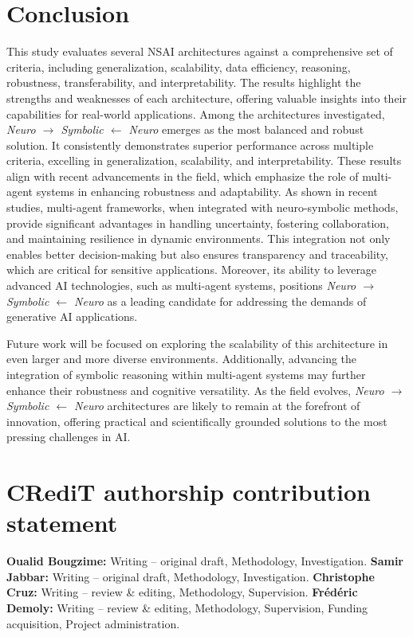 \documentclass[12pt]{article}
\begin{document}
\section{Conclusion}
This study evaluates several NSAI architectures against a comprehensive set of criteria, including generalization, scalability, data efficiency, reasoning, robustness, transferability, and interpretability. The results highlight the strengths and weaknesses of each architecture, offering valuable insights into their capabilities for real-world applications. Among the architectures investigated, \textit{Neuro $\to$ Symbolic $\leftarrow$ Neuro} emerges as the most balanced and robust solution. It consistently demonstrates superior performance across multiple criteria, excelling in generalization, scalability, and interpretability. These results align with recent advancements in the field, which emphasize the role of multi-agent systems in enhancing robustness and adaptability. As shown in recent studies, multi-agent frameworks, when integrated with neuro-symbolic methods, provide significant advantages in handling uncertainty, fostering collaboration, and maintaining resilience in dynamic environments. This integration not only enables better decision-making but also ensures transparency and traceability, which are critical for sensitive applications.  Moreover, its ability to leverage advanced AI technologies, such as multi-agent systems, positions \textit{Neuro $\to$ Symbolic $\leftarrow$ Neuro} as a leading candidate for addressing the demands of generative AI applications.

\vspace*{0.5cm}

Future work will be focused on exploring the scalability of this architecture in even larger and more diverse environments. Additionally, advancing the integration of symbolic reasoning within multi-agent systems may further enhance their robustness and cognitive versatility. As the field evolves, \textit{Neuro $\to$ Symbolic $\leftarrow$ Neuro} architectures are likely to remain at the forefront of innovation, offering practical and scientifically grounded solutions to the most pressing challenges in AI.

\section*{CRediT authorship contribution statement}
\textbf{Oualid Bougzime:} Writing – original draft, Methodology, Investigation. \textbf{Samir Jabbar:} Writing – original draft, Methodology, Investigation. \textbf{Christophe Cruz:} Writing – review \& editing, Methodology, Supervision. \textbf{Fr\'ed\'eric Demoly:} Writing –
review \& editing, Methodology, Supervision, Funding acquisition, Project administration.
\end{document}
